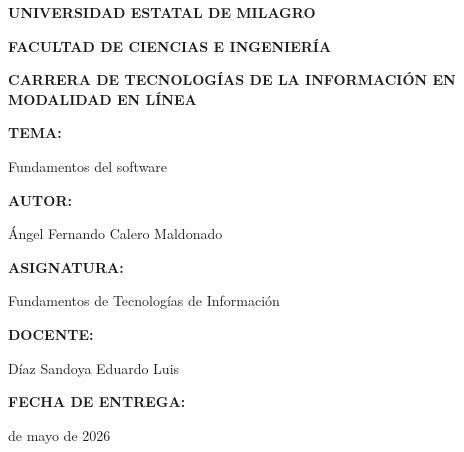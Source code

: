 \documentclass[12pt,a4paper]{article}
\begin{document}
	\begin{center}
		\singlespacing
		
		\vspace*{2cm}
		
		{\fontsize{14}{16}\selectfont\bfseries UNIVERSIDAD ESTATAL DE MILAGRO\par}
		\vspace{0.5cm}
		
		{\fontsize{13}{15}\selectfont\bfseries FACULTAD DE CIENCIAS E INGENIERÍA\par}
		\vspace{0.5cm}
		
		{\fontsize{13}{15}\selectfont\bfseries CARRERA DE TECNOLOGÍAS DE LA INFORMACIÓN EN MODALIDAD EN LÍNEA\par}
		
		\vspace{1.5cm}
		
		{\fontsize{13}{15}\selectfont\bfseries TEMA:\par}
		\vspace{0.2cm}
		{\fontsize{13}{15}\selectfont Fundamentos del software\par}
		
		\vspace{1cm}
		
		{\fontsize{13}{15}\selectfont\bfseries AUTOR:\par}
		\vspace{0.2cm}
		{\fontsize{13}{15}\selectfont Ángel Fernando Calero Maldonado\par}
		
		\vspace{1cm}
		
		{\fontsize{13}{15}\selectfont\bfseries ASIGNATURA:\par}
		\vspace{0.2cm}
		{\fontsize{13}{15}\selectfont Fundamentos de Tecnologías de Información\par}
		
		\vspace{1cm}
		
		{\fontsize{13}{15}\selectfont\bfseries DOCENTE:\par}
		\vspace{0.2cm}
		{\fontsize{13}{15}\selectfont Díaz Sandoya Eduardo Luis\par}
		
		\vspace{1cm}
		
		{\fontsize{13}{15}\selectfont\bfseries FECHA DE ENTREGA:\par}
		\vspace{0.2cm}
		{\fontsize{13}{15} de mayo de 2026\par}
		

\end{center}
\end{document}
